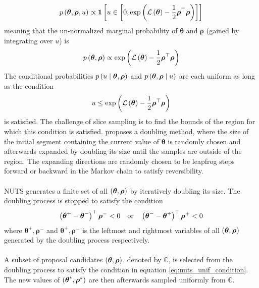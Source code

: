 \begin{equation*}
    p \left (\boldsymbol{\theta}, \boldsymbol{\rho}, u\right) \propto \mathbf{1} \left [ u \in \left [0,\exp{\left(\mathcal{L} \left (\boldsymbol{\theta}\right) - \frac{1}{2} \boldsymbol{\rho}^\top \boldsymbol{\rho}\right)} \right] \right]
\end{equation*}
meaning that the un-normalized marginal probability of $\boldsymbol{\theta}$ and $\boldsymbol{\rho}$ (gained by integrating over $u$) is 
\begin{equation*}
    p \left (\boldsymbol{\theta}, \boldsymbol{\rho}\right) \propto \exp{\left(\mathcal{L} \left (\boldsymbol{\theta}\right) - \frac{1}{2} \boldsymbol{\rho}^\top \boldsymbol{\rho}\right)}
\end{equation*}
The conditional probabilities $p \left (u \mid \boldsymbol{\theta}, \boldsymbol{\rho}\right)$ and $p \left (\boldsymbol{\theta}, \boldsymbol{\rho} \mid u\right)$ are each uniform as long as the condition
\begin{equation} \label{eq:nuts_unif_condition}
    u \leq \exp{\left(\mathcal{L} \left (\boldsymbol{\theta}\right) - \frac{1}{2} \boldsymbol{\rho}^\top \boldsymbol{\rho}\right)}
\end{equation}
is satisfied. The challenge of slice sampling is to find the bounds of the region for which this condition is satisfied. \cite{neal_slice_sampling} proposes a doubling method, where the size of the initial segment containing the current value of $\boldsymbol{\theta}$ is randomly chosen and afterwards expanded by doubling its size until the samples are outside of the region. The expanding directions are randomly chosen to be leapfrog steps forward or backward in the Markov chain to satisfy reversibility.
\\
\\
NUTS generates a finite set of all $\left (\boldsymbol{\theta}, \boldsymbol{\rho}\right)$ by iteratively doubling its size. The doubling process is stopped to satisfy the condition 
\begin{equation*}
    \left (\boldsymbol{\theta}^+ - \boldsymbol{\theta}^-\right)^\top \boldsymbol{\rho}^- < 0 \quad \text{or} \quad \left (\boldsymbol{\theta}^- - \boldsymbol{\theta}^+\right)^\top \boldsymbol{\rho}^+ < 0
\end{equation*}
where $\boldsymbol{\theta}^+, \boldsymbol{\rho}^-$ and $\boldsymbol{\theta}^+, \boldsymbol{\rho}^-$ is the leftmost and rightmost variables of all $\left (\boldsymbol{\theta}, \boldsymbol{\rho}\right)$ generated by the doubling process respectively. 
\\
\\
A subset of proposal candidates $\left (\boldsymbol{\theta}, \boldsymbol{\rho}\right)$, denoted by $\mathbb{C}$, is selected from the doubling process to satisfy the condition in equation \ref{eq:nuts_unif_condition}. The new values of $\left (\boldsymbol{\theta}^*, \boldsymbol{\rho}^*\right)$ are then afterwards sampled uniformly from $\mathbb{C}$. 
